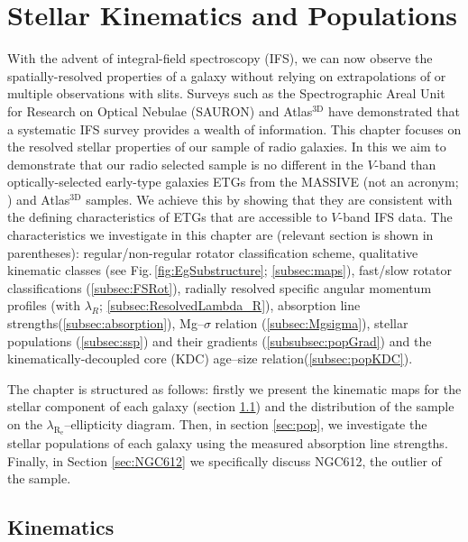 \chapter{Stellar Kinematics and Populations}
	\label{cha:stellar}
With the advent of integral-field spectroscopy (IFS), we can now observe the spatially-resolved properties of a galaxy without relying on extrapolations of or multiple observations with slits. Surveys such as the Spectrographic Areal Unit for Research on Optical Nebulae (SAURON) \citep{deZeeuw2002} and Atlas$^\text{3D}$ \citep{Cappellari2011} have demonstrated that a systematic IFS survey provides a wealth of information. This chapter focuses on the resolved stellar properties of our sample of radio galaxies. In this we aim to demonstrate that our radio selected sample is no different in the $V$-band than optically-selected early-type galaxies ETGs from the MASSIVE (not an acronym; \citealt{Ma2014}) and Atlas$^\text{3D}$ samples. We achieve this by showing that they are consistent with the defining characteristics of ETGs that are accessible to $V$-band IFS data. The characteristics we investigate in this chapter are (relevant section is shown in parentheses): regular/non-regular rotator classification scheme, qualitative kinematic classes (see Fig.\,\ref{fig:EgSubstructure}; \ref{subsec:maps}), fast/slow rotator classifications (\ref{subsec:FSRot}), radially resolved specific angular momentum profiles (with $\lambda_R$; \ref{subsec:ResolvedLambda_R}), absorption line strengths(\ref{subsec:absorption}), Mg--$\sigma$ relation (\ref{subsec:Mgsigma}), stellar populations (\ref{subsec:ssp}) and their gradients (\ref{subsubsec:popGrad}) and the kinematically-decoupled core (KDC) age--size relation(\ref{subsec:popKDC}). 

The chapter is structured as follows: firstly we present the kinematic maps for the stellar component of each galaxy (section \ref{sec:stellarKin}) and the distribution of the sample on the $\lambda_\mathrm{R_e}$--ellipticity diagram. Then, in section \ref{sec:pop}, we investigate the stellar populations of each galaxy using the measured absorption line strengths. Finally, in Section \ref{sec:NGC612} we specifically discuss NGC612, the outlier of the sample.


\section{Kinematics}
	\label{sec:stellarKin}

